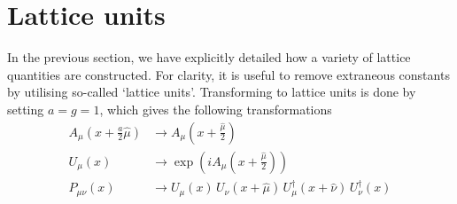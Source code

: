 \section{Lattice units}

In the previous section, we have explicitly detailed how a variety of lattice quantities are constructed. For clarity, it is useful to remove extraneous constants by utilising so-called `lattice units'. Transforming to lattice units is done by setting $a=g=1$, which gives the following transformations
%
\begin{align*}
A_\mu \left( x+\frac{a}{2}\hat{\mu} \right)&\rightarrow A_\mu \left(x+\frac{\hat{\mu}}{2} \right)\\
U_\mu(x) &\rightarrow \exp\left( i A_\mu \left(x+\frac{\hat{\mu}}{2}\right)\right)\\
P_{\mu\nu}(x) &\rightarrow U_\mu(x)\,U_\nu(x+\hat{\mu})\, U_\mu^\dag(x+\hat{\nu})\, U_\nu^\dag(x)
\end{align*}
%
%
%
%
%
